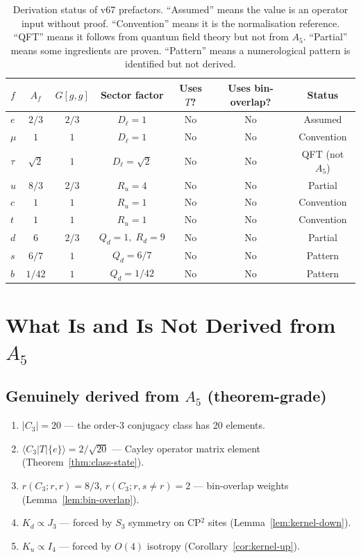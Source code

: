 \documentclass[11pt]{article}
\theoremstyle{remark}
\begin{document}
\begin{table}[h]
\centering
\renewcommand{\arraystretch}{1.3}
\begin{tabular}{@{}lcccccc@{}}
\toprule
$f$ & $A_f$ & $G[g,g]$ & Sector factor & Uses $T$? & Uses bin-overlap? & Status \\
\midrule
$e$   & $2/3$     & $2/3$ & $D_\ell = 1$    & No & No & Assumed \\
$\mu$ & $1$       & $1$   & $D_\ell = 1$    & No & No & Convention \\
$\tau$& $\sqrt{2}$& $1$   & $D_\ell = \sqrt{2}$ & No & No & QFT (not $A_5$) \\
$u$   & $8/3$     & $2/3$ & $R_u = 4$       & No & No & Partial \\
$c$   & $1$       & $1$   & $R_u = 1$       & No & No & Convention \\
$t$   & $1$       & $1$   & $R_u = 1$       & No & No & Convention \\
$d$   & $6$       & $2/3$ & $Q_d = 1,\; R_d = 9$ & No & No & Partial \\
$s$   & $6/7$     & $1$   & $Q_d = 6/7$     & No & No & Pattern \\
$b$   & $1/42$    & $1$   & $Q_d = 1/42$    & No & No & Pattern \\
\bottomrule
\end{tabular}
\caption{Derivation status of v67 prefactors.  ``Assumed'' means the value is an operator input without proof.  ``Convention'' means it is the normalisation reference.  ``QFT'' means it follows from quantum field theory but not from $A_5$.  ``Partial'' means some ingredients are proven.  ``Pattern'' means a numerological pattern is identified but not derived.}
\end{table}

\section{What Is and Is Not Derived from $A_5$}

\subsection{Genuinely derived from $A_5$ (theorem-grade)}

\begin{enumerate}[nosep]
  \item $|C_3| = 20$ --- the order-3 conjugacy class has 20 elements.
  \item $\langle C_3 | T | \{e\}\rangle = 2/\sqrt{20}$ --- Cayley operator matrix element (Theorem~\ref{thm:class-state}).
  \item $r(C_3; r,r) = 8/3$, $r(C_3; r,s \neq r) = 2$ --- bin-overlap weights (Lemma~\ref{lem:bin-overlap}).
  \item $K_d \propto J_3$ --- forced by $S_3$ symmetry on CP$^2$ sites (Lemma~\ref{lem:kernel-down}).
  \item $K_u \propto I_4$ --- forced by $O(4)$ isotropy (Corollary~\ref{cor:kernel-up}).
\end{enumerate}
\end{document}
